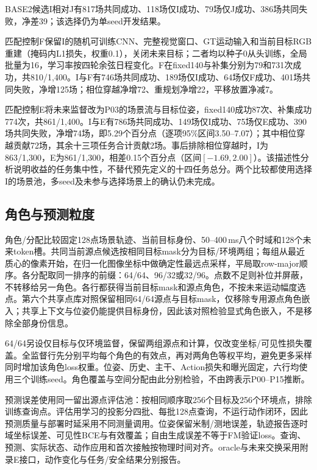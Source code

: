 \renewcommand{\small}{\fontsize{8.25}{10.25}\selectfont}


\endgroup

BASE2候选I相对J有817场共同成功、118场仅I成功、79场仅J成功、386场共同失败，净差39；该选择仍为单seed开发结果。

匹配控制F保留I的随机可训练CNN、完整视觉窗口、GT运动输入和当前目标RGB重建（掩码内L1损失，权重0.1），关闭未来目标；二者均以种子0从头训练，全局批量为16，学习率按四轮余弦日程变化。F在fixed140与补集分别为79和731次成功，共810/1,400。I与F有746场共同成功、189场仅I成功、64场仅F成功、401场共同失败，净增125场；相位穿越净增72、重规划净增22，平移放置净减7。

匹配控制E将未来监督改为P03的场景流与目标位姿，fixed140成功87次、补集成功774次，共861/1,400。I与E有786场共同成功、149场仅I成功、75场仅E成功、390场共同失败，净增74场，即5.29个百分点（逐项95\%区间3.50--7.07）；其中相位穿越贡献72场，其余十三项任务合计贡献2场。事后排除相位穿越时，I为863/1,300，E为861/1,300，相差0.15个百分点（区间$[-1.69,2.00]$）。该描述性分析说明收益的任务集中性，不替代预先定义的十四任务总分。两个比较都使用选择I的场景池，多seed及未参与选择场景上的确认仍未完成。

\subsection{角色与预测粒度}
角色/分配比较固定128点场景轨迹、当前目标身份、50--400\,ms八个时域和128个未来token槽。共同当前源点候选按相同目标mask分为目标/环境两组；每组从最近质心的像素开始，在归一化图像坐标中做确定性最远点采样，平局取row-major顺序。各分配取同一排序的前缀：64/64、96/32或32/96。点数不足则补位并屏蔽，不转移给另一角色。各行都获得当前目标mask和源点角色，不按未来运动幅度选点。第六个共享点库对照保留相同64/64源点与目标mask，仅移除专用源点角色嵌入；共享上下文与位姿仍能提供目标身份，因此该对照检验显式角色嵌入，不是移除全部身份信息。

64/64另设仅目标与仅环境监督，保留两组源点和计算，仅改变坐标/可见性损失覆盖。全监督行先分别平均每个角色的有效点，再对两角色等权平均，避免更多采样同时增加该角色loss权重。位姿、历史、主干、Action损失和曝光固定，六行均使用三个训练seed。角色覆盖与空间分配由此分别检验，不由跨表示P00--P15推断。



预测误差使用同一留出源点评估池：按相同顺序取256个目标及256个环境点，排除训练查询点。评估用学习的投影分四批、每批128点查询，不运行动作闭环，因此预测质量与部署时延采用不同测量调用。位姿保留米制/测地误差，轨迹报告逐时域坐标误差、可见性BCE与有效覆盖；自由生成误差不等于FM验证loss。查询、预测、实际状态、动作应用和首次接触按物理时间对齐。oracle与未来交换采用附录E接口，动作变化与任务/安全结果分别报告。
\endgroup

